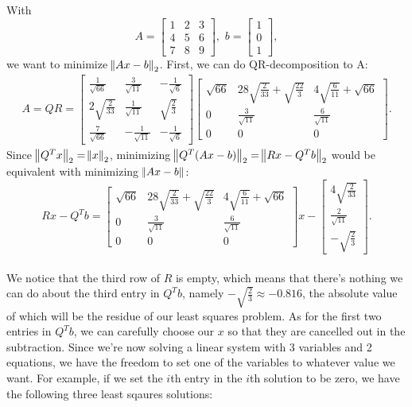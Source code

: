 \documentclass[11pt]{article}
\begin{document}
\section{}
With $$A = \begin{bmatrix} 
1 & 2 & 3 \\
4 & 5 & 6 \\
7 & 8 & 9 
\end{bmatrix},\,\,
b = \begin{bmatrix} 1 \\ 0 \\ 1\end{bmatrix},
$$
we want to minimize $\norm{Ax - b}_2$. First, we can do QR-decomposition to A:
\begin{equation}\begin{split} 
A = QR = 
\begin{bmatrix} 
\frac1{\sqrt{66}} & \frac3{\sqrt{11}} & -\frac1{\sqrt{6}} \\
2\sqrt{\frac2{33}} & \frac1{\sqrt{11}} & \sqrt{\frac23} \\
\frac7{\sqrt{66}} & -\frac1{\sqrt{11}} & -\frac1{\sqrt{6}}
\end{bmatrix} 
\begin{bmatrix} 
\sqrt{66} & 28\sqrt{\frac2{33}} + \sqrt{\frac{22}3} & 4\sqrt{\frac6{11}} + \sqrt{66} \\
0 & \frac{3}{\sqrt{11}} & \frac6{\sqrt{11}} \\
0 & 0 & 0
\end{bmatrix}. 
\end{split}\nonumber\end{equation} 
Since $\norm{Q^Tx}_2 = \norm{x}_2$, minimizing $\norm{Q^T(Ax-b)}_2 = \norm{Rx-Q^Tb}_2$ would be equivalent with minimizing $\norm{Ax-b}$: 
$$Rx-Q^Tb = 
\begin{bmatrix} 
\sqrt{66} & 28\sqrt{\frac2{33}} + \sqrt{\frac{22}3} & 4\sqrt{\frac6{11}} + \sqrt{66} \\
0 & \frac{3}{\sqrt{11}} & \frac6{\sqrt{11}} \\
0 & 0 & 0
\end{bmatrix}x-
\begin{bmatrix} 
4\sqrt{\frac2{33}} \\ \frac2{\sqrt{11}} \\ -\sqrt{\frac23}
\end{bmatrix}.
$$
\\[0.3cm]
We notice that the third row of $R$ is empty, which means that there's nothing we can do about the third entry in $Q^Tb$, namely $-\sqrt{\frac23} \approx -0.816$, the absolute value of which will be the residue of our least squares problem. As for the first two entries in $Q^Tb$, we can carefully choose our $x$ so that they are cancelled out in the subtraction. Since we're now solving a linear system with 3 variables and 2 equations, we have the freedom to set one of the variables to whatever value we want. For example, if we set the $i$th entry in the $i$th solution to be zero, we have the following three least sqaures solutions:
\end{document}
